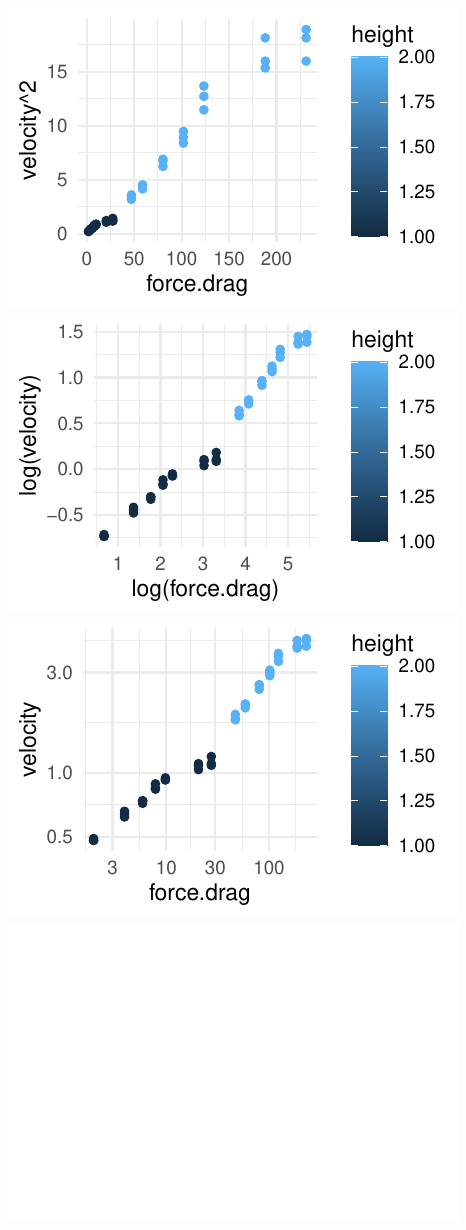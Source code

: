 \documentclass[twoside]{book}\usepackage[]{graphicx}\usepackage[]{xcolor}
\makeatletter
\def\maxwidth{ %
  \ifdim\Gin@nat@width>\linewidth
    \linewidth
  \else
    \Gin@nat@width
  \fi
}
\newenvironment{knitrout}{}{} %
\makeatother
\begin{document}
\begin{solution}
\begin{knitrout}
{\centering \includegraphics[width=\maxwidth]{figures/fig-drag-plots-1} 
\includegraphics[width=\maxwidth]{figures/fig-drag-plots-2} 
\includegraphics[width=\maxwidth]{figures/fig-drag-plots-3} 
\includegraphics[width=\maxwidth]{figures/fig-drag-plots-4} 

}
\end{knitrout}
\end{solution}
\end{document}
